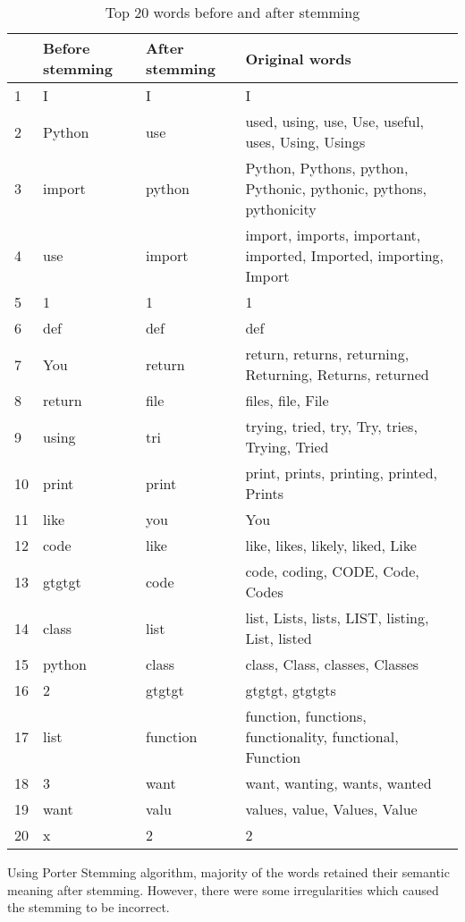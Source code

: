 \begin{table}[htp]
\caption{Top 20 words before and after stemming}\label{stem}
\begin{tabu}{X[1,l]X[4,l]|X[4,l]X[10,l]}
    \textbf{} & \textbf{Before stemming} &
    \textbf{After stemming} & \textbf{Original words} \\
     & I & I & I \\
    2 & Python & use &
    used, using, use, Use, useful, uses, Using, Usings \\
    3 & import & python &
    Python, Pythons, python, Pythonic, pythonic, pythons, pythonicity \\
    4 & use & import &
    import, imports, important, imported, Imported, importing, Import \\
    5 & 1 & 1 & 1 \\
    6 & def & def & def \\
    7 & You & return & 
    return, returns, returning, Returning, Returns, returned \\
    8 & return & file &
    files, file, File \\
    9 & using & tri &
    trying, tried, try, Try, tries, Trying, Tried \\
    10 & print & print &
    print, prints, printing, printed, Prints \\
    11 & like & you & You \\
    12 & code & like & 
    like, likes, likely, liked, Like \\
    13 & gtgtgt & code &
    code, coding, CODE, Code, Codes \\
    14 & class & list &
    list, Lists, lists, LIST, listing, List, listed \\
    15 & python & class &
    class, Class, classes, Classes \\
    16 & 2 & gtgtgt &
    gtgtgt, gtgtgts \\
    17 & list & function &
    function, functions, functionality, functional, Function \\
    18 & 3 & want &
    want, wanting, wants, wanted \\
    19 & want & valu &
    values, value, Values, Value \\
    20 & x & 2 & 2
\end{tabu} 
\end{table}

Using Porter Stemming algorithm, majority of the words retained their
semantic meaning after stemming. However, there were some irregularities
which caused the stemming to be incorrect.

